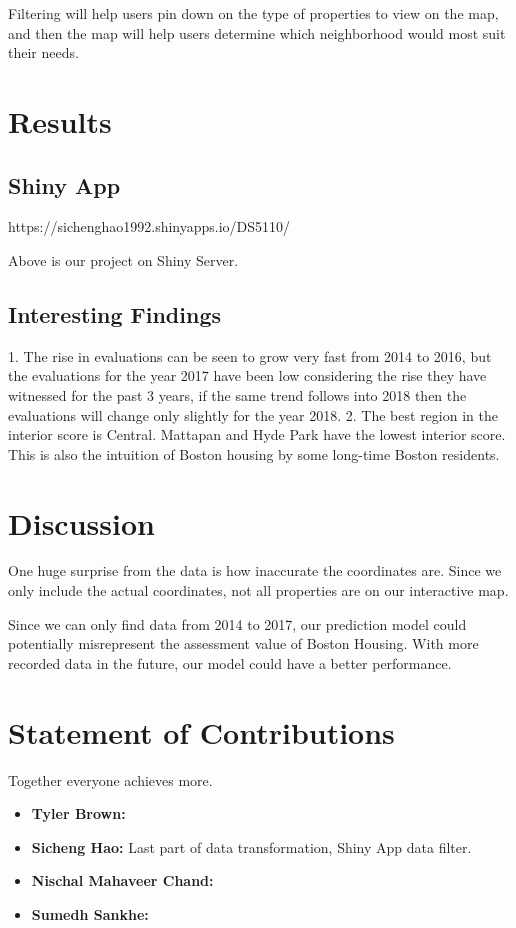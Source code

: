 \documentclass[12pt]{article}
\begin{document}
Filtering will help users pin down on the type of properties to view on
the map, and then the map will help users determine which neighborhood
would most suit their needs.

\section*{Results}

\subsection{Shiny App}

https://sichenghao1992.shinyapps.io/DS5110/

Above is our project on Shiny Server. 

\subsection{Interesting Findings}
1. The rise in evaluations can be seen to grow very fast from 2014 to 2016, but the 
evaluations for the year 2017 have been low considering the rise they have witnessed 
for the past 3 years, if the same trend follows into 2018 then the evaluations will change 
only slightly for the year 2018.
2. The best region in the interior score is Central. Mattapan and Hyde Park have the lowest interior score. This is also the intuition of Boston housing by some long-time Boston residents. 

\section*{Discussion}

One huge surprise from the data is how inaccurate the coordinates are. Since we only include the actual coordinates, not all properties are on our interactive map. 

Since we can only find data from 2014 to 2017, our prediction model could potentially misrepresent the assessment value of Boston Housing. With more recorded data in the future, our model could have a better performance.

\section*{Statement of Contributions}

Together everyone achieves more.

\begin{itemize}
\item \textbf{Tyler Brown:}
\item \textbf{Sicheng Hao:} Last part of data transformation, Shiny App data filter.
\item \textbf{Nischal Mahaveer Chand:}
\item \textbf{Sumedh Sankhe:}
\end{itemize}
\end{document}
